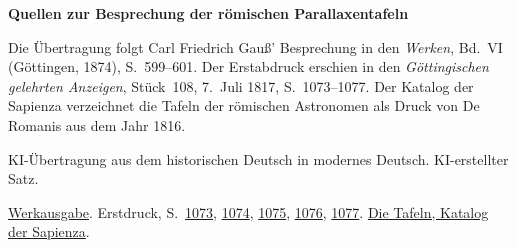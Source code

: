 \clearpage\thispagestyle{empty}
\begin{center}\Large\bfseries Quellen zur Besprechung der römischen Parallaxentafeln\end{center}

Die Übertragung folgt Carl Friedrich Gauß’ Besprechung in den \emph{Werken}, Bd.~VI (Göttingen, 1874), S.~599--601. Der Erstabdruck erschien in den \emph{Göttingischen gelehrten Anzeigen}, Stück~108, 7.~Juli 1817, S.~1073--1077. Der Katalog der Sapienza verzeichnet die Tafeln der römischen Astronomen als Druck von De Romanis aus dem Jahr 1816.

KI-Übertragung aus dem historischen Deutsch in modernes Deutsch. KI-erstellter Satz.

\href{https://gdz.sub.uni-goettingen.de/id/PPN236007467}{Werkausgabe}. Erstdruck, S.~\href{https://images.p.sub.uni-goettingen.de/iiif/image/gdz:PPN319721507_1817:00001085/full/1650,/0/default.jpg}{1073}, \href{https://images.p.sub.uni-goettingen.de/iiif/image/gdz:PPN319721507_1817:00001086/full/1650,/0/default.jpg}{1074}, \href{https://images.p.sub.uni-goettingen.de/iiif/image/gdz:PPN319721507_1817:00001087/full/1650,/0/default.jpg}{1075}, \href{https://images.p.sub.uni-goettingen.de/iiif/image/gdz:PPN319721507_1817:00001088/full/1650,/0/default.jpg}{1076}, \href{https://images.p.sub.uni-goettingen.de/iiif/image/gdz:PPN319721507_1817:00001089/full/1650,/0/default.jpg}{1077}. \href{https://sapienzadigitallibrary.uniroma1.it/DigitalResource/itrousr-DigitalResource_RMSIC_00024432}{Die Tafeln, Katalog der Sapienza}.

\clearpage
